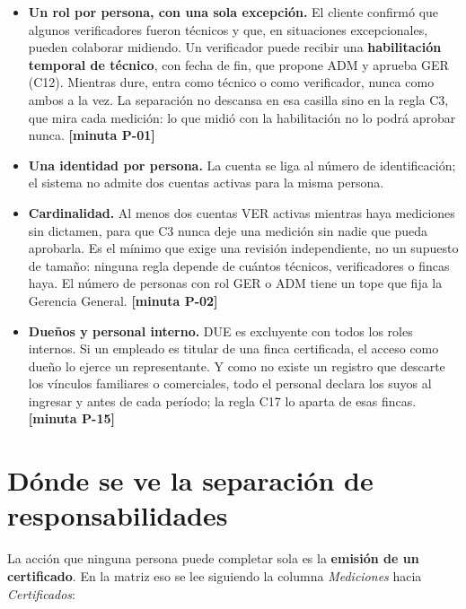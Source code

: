 \documentclass[11pt,letterpaper]{article}
\newcommand{\resp}[1]{\textrm{\footnotesize\bfseries [minuta #1]}}
\begin{document}
\begin{itemize}
\item \textbf{Un rol por persona, con una sola excepción.} El cliente confirmó que algunos verificadores
      fueron técnicos y que, en situaciones excepcionales, pueden colaborar midiendo. Un verificador
      puede recibir una \textbf{habilitación temporal de técnico}, con fecha de fin, que propone ADM y
      aprueba GER (C12). Mientras dure, entra como técnico o como verificador, nunca como ambos a la
      vez. La separación no descansa en esa casilla sino en la regla C3, que mira cada medición: lo
      que midió con la habilitación no lo podrá aprobar nunca. \resp{P-01}
\item \textbf{Una identidad por persona.} La cuenta se liga al número de identificación; el sistema no
      admite dos cuentas activas para la misma persona.
\item \textbf{Cardinalidad.} Al menos dos cuentas VER activas mientras haya mediciones sin dictamen,
      para que C3 nunca deje una medición sin nadie que pueda aprobarla. Es el mínimo que exige una
      revisión independiente, no un supuesto de tamaño: ninguna regla depende de cuántos técnicos,
      verificadores o fincas haya. El número de personas con rol GER o ADM tiene un tope que fija la
      Gerencia General. \resp{P-02}
\item \textbf{Dueños y personal interno.} DUE es excluyente con todos los roles internos. Si un empleado
      es titular de una finca certificada, el acceso como dueño lo ejerce un representante. Y como
      no existe un registro que descarte los vínculos familiares o comerciales, todo el personal
      declara los suyos al ingresar y antes de cada período; la regla C17 lo aparta de esas fincas.
      \resp{P-15}
\end{itemize}

\section{Dónde se ve la separación de responsabilidades}

La acción que ninguna persona puede completar sola es la \textbf{emisión de un certificado}. En la
matriz eso se lee siguiendo la columna \emph{Mediciones} hacia \emph{Certificados}:
\end{document}
